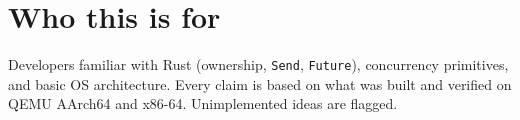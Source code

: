 \section{Who this is for}

Developers familiar with Rust (ownership, \texttt{Send}, \texttt{Future}),
concurrency primitives, and basic OS architecture. Every claim is based on what
was built and verified on QEMU AArch64 and x86-64. Unimplemented ideas are
flagged.

\endinput
